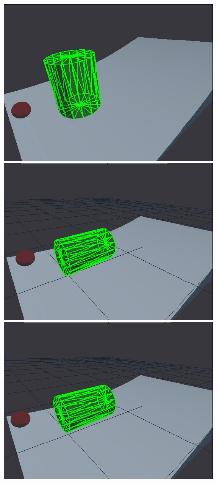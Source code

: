 \begin{figure}[htbp]
\centerline{
\includegraphics[width=\imgwid]{./A00000}
\includegraphics[width=\imgwid]{./B00257}
\includegraphics[width=\imgwid]{./C00900}
}
\end{figure}
